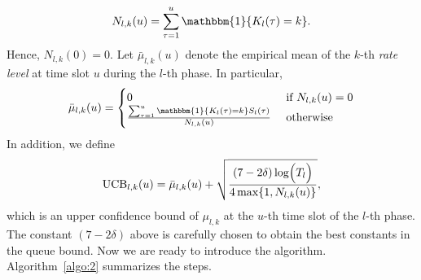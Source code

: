 \documentclass[12pt,draftcls, onecolumn]{IEEEtran}
\begin{document}
\begin{align}
    N_{l,k}(u) = \sum_{\tau = 1}^u \mathbbm{1}\{K_l(\tau) = k \}. \nonumber
\end{align}
Hence, $N_{l,k}(0) = 0$. Let $\bar{\mu}_{l,k}(u)$ denote the empirical mean of the $k$-th \emph{rate level} at time slot $u$ during the $l$-th phase. In particular,
\begin{align}
    \bar{\mu}_{l,k}(u) = \begin{cases}
        0 & \text{ if }  N_{l,k}(u) = 0\\
        \frac{\sum_{\tau = 1}^u \mathbbm{1}\{K_l(\tau) = k \}S_l(\tau)}{N_{l,k}(u)} & \text{ otherwise}
    \end{cases} \nonumber
\end{align}
In addition, we define
\begin{equation} \label{eq:ucb}
    \text{UCB}_{l,k}(u) = \bar{\mu}_{l,k}(u) + \sqrt{\frac{(7-2\delta)
\log\Bigl(T_l\Bigr)}{4\max\{1, N_{l,k}(u)\}}},
\end{equation}
which is an upper confidence bound of $\mu_{l,k}$ at the $u$-th time slot of the $l$-th phase. The constant $(7-2\delta)$ above is carefully chosen to obtain the best constants in the queue bound.
Now we are ready to introduce the algorithm. Algorithm~\ref{algo:2} summarizes the steps.
\end{document}

